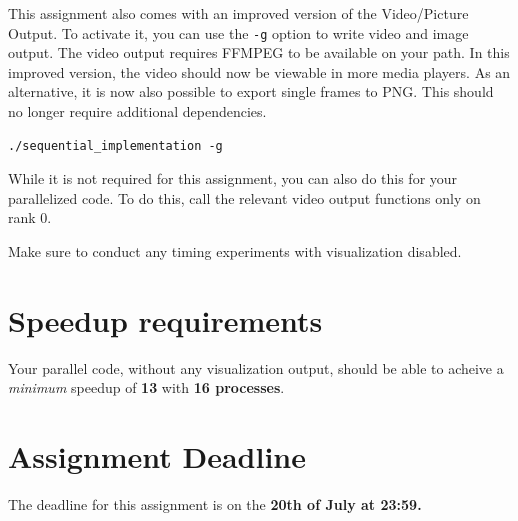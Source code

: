 \documentclass[11pt]{article}
\begin{document}
This assignment also comes with an improved version of the Video/Picture Output. To activate it, you can use the \texttt{-g} option to write video and image output. The video output requires FFMPEG to be available on your path. In this improved version, the video should now be viewable in more media players. As an alternative, it is now also possible to export single frames to PNG. This should no longer require additional dependencies.

\begin{verbatim}
./sequential_implementation -g
\end{verbatim}

While it is not required for this assignment, you can also do this for your parallelized code. To do this, call the relevant video output functions only on rank 0.

Make sure to conduct any timing experiments with visualization disabled.

\section{Speedup requirements}
\label{sec:org2b70086}

Your parallel code, without any visualization output, should be able to acheive a \emph{minimum} speedup of \textbf{13} with \textbf{16 processes}.  

\section{Assignment Deadline}
\label{sec:org8396d51}

The deadline for this assignment is on the \textbf{20th of July at 23:59.} 
\end{document}
